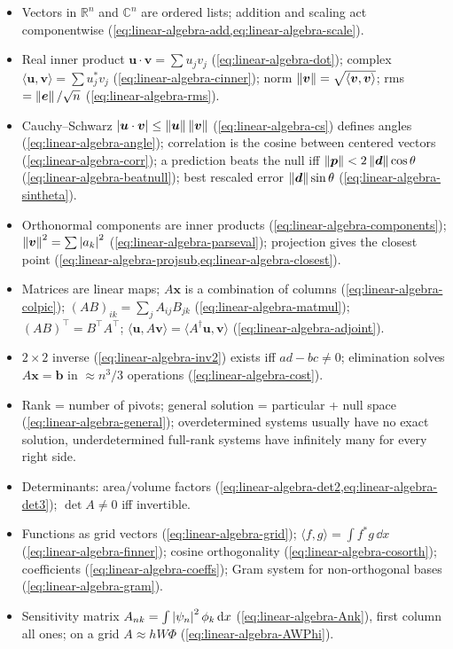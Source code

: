 \begin{itemize}
\item Vectors in $\mathbb R^n$ and $\mathbb C^n$ are ordered lists; addition and scaling act componentwise (\cref{eq:linear-algebra-add,eq:linear-algebra-scale}).
\item Real inner product $\bm u\cdot\bm v=\sum u_jv_j$ (\cref{eq:linear-algebra-dot}); complex $\langle\bm u,\bm v\rangle=\sum u_j^*v_j$ (\cref{eq:linear-algebra-cinner}); norm $\left\lVert \bm v\right\rVert=\sqrt{\langle\bm v,\bm v\rangle}$; rms $=\left\lVert \bm e\right\rVert/\sqrt n$ (\cref{eq:linear-algebra-rms}).
\item Cauchy--Schwarz $\left\lvert \bm u\cdot\bm v\right\rvert\le\left\lVert \bm u\right\rVert\left\lVert \bm v\right\rVert$ (\cref{eq:linear-algebra-cs}) defines angles (\cref{eq:linear-algebra-angle}); correlation is the cosine between centered vectors (\cref{eq:linear-algebra-corr}); a prediction beats the null iff $\left\lVert \bm p\right\rVert<2\left\lVert \bm d\right\rVert\cos\theta$ (\cref{eq:linear-algebra-beatnull}); best rescaled error $\left\lVert \bm d\right\rVert\sin\theta$ (\cref{eq:linear-algebra-sintheta}).
\item Orthonormal components are inner products (\cref{eq:linear-algebra-components}); $\left\lVert \bm v\right\rVert^2=\sum\left\lvert a_k\right\rvert^2$ (\cref{eq:linear-algebra-parseval}); projection gives the closest point (\cref{eq:linear-algebra-projsub,eq:linear-algebra-closest}).
\item Matrices are linear maps; $A\bm x$ is a combination of columns (\cref{eq:linear-algebra-colpic}); $(AB)_{ik}=\sum_jA_{ij}B_{jk}$ (\cref{eq:linear-algebra-matmul}); $(AB)^\top=B^\top A^\top$; $\langle\bm u,A\bm v\rangle=\langle A^\dagger\bm u,\bm v\rangle$ (\cref{eq:linear-algebra-adjoint}).
\item $2\times2$ inverse (\cref{eq:linear-algebra-inv2}) exists iff $ad-bc\ne0$; elimination solves $A\bm x=\bm b$ in $\approx n^3/3$ operations (\cref{eq:linear-algebra-cost}).
\item Rank = number of pivots; general solution = particular + null space (\cref{eq:linear-algebra-general}); overdetermined systems usually have no exact solution, underdetermined full-rank systems have infinitely many for every right side.
\item Determinants: area/volume factors (\cref{eq:linear-algebra-det2,eq:linear-algebra-det3}); $\det A\ne0$ iff invertible.
\item Functions as grid vectors (\cref{eq:linear-algebra-grid}); $\langle f,g\rangle=\int f^*g\,\dd x$ (\cref{eq:linear-algebra-finner}); cosine orthogonality (\cref{eq:linear-algebra-cosorth}); coefficients (\cref{eq:linear-algebra-coeffs}); Gram system for non-orthogonal bases (\cref{eq:linear-algebra-gram}).
\item Sensitivity matrix $A_{nk}=\int\left\lvert \psi_n\right\rvert^2\phi_k\,\mathrm{d} x$ (\cref{eq:linear-algebra-Ank}), first column all ones; on a grid $A\approx hW\Phi$ (\cref{eq:linear-algebra-AWPhi}).
\end{itemize}

